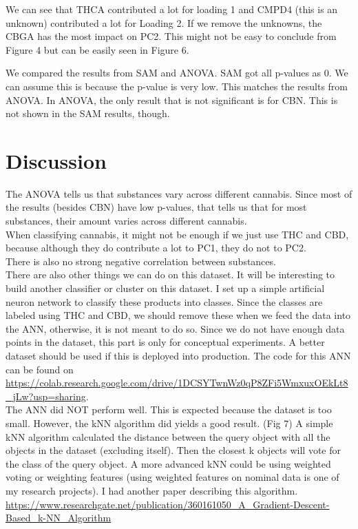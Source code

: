 \documentclass{article}
\begin{document}
\raggedright


We can see that THCA contributed a lot for loading 1 and CMPD4 (this is an unknown) contributed a lot for Loading 2. If we remove the unknowns, the CBGA has the most impact on PC2. This might not be easy to conclude from Figure 4 but can be easily seen in Figure 6.

We compared the results from SAM and ANOVA. SAM got all p-values as 0. We can assume this is because the p-value is very low. This matches the results from ANOVA. In ANOVA, the only result that is not significant is  for CBN. This is not shown in the SAM results, though. 

\section{Discussion}
The ANOVA tells us that substances vary across different cannabis. Since most of the results (besides CBN) have low p-values, that tells us that for most substances, their amount varies across different cannabis.\\
When classifying cannabis, it might not be enough if we just use THC and CBD, because although they do contribute a lot to PC1, they do not to PC2. \\
There is also no strong negative correlation between substances.\\
There are also other things we can do on this dataset. It will be interesting to build another classifier or cluster on this dataset. I set up a simple artificial neuron network to classify these products into classes. Since the classes are labeled using THC and CBD, we should remove these when we feed the data into the ANN, otherwise, it is not meant to do so.
Since we do not have enough data points in the dataset, this part is only for conceptual experiments. A better dataset should be used if this is deployed into production. The code for this ANN can be found on \url{https://colab.research.google.com/drive/1DCSYTwnWz0qP8ZFi5WmxuxOEkLt8_jLw?usp=sharing}.\\
The ANN did NOT perform well. This is expected because the dataset is too small. However, the kNN algorithm did yields a good result. (Fig 7) A simple kNN algorithm calculated the distance between the query object with all the objects in the dataset (excluding itself). Then the closest k objects will vote for the class of the query object. A more advanced kNN could be using weighted voting or weighting features (using weighted features on nominal data is one of my research projects). I had another paper describing this algorithm. \url{https://www.researchgate.net/publication/360161050_A_Gradient-Descent-Based_k-NN_Algorithm} 
\end{document}
